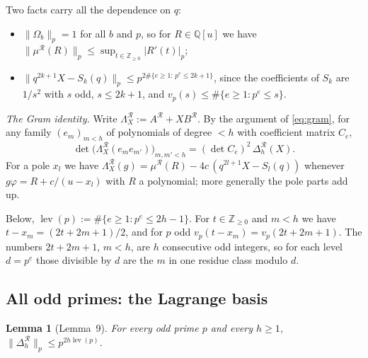 \documentclass[11pt]{amsart}
\newtheorem{lemma}[theorem]{Lemma}
\theoremstyle{definition}
\theoremstyle{remark}
\numberwithin{equation}{section}
\newcommand{\ZZ}{\mathbb{Z}}
\newcommand{\QQ}{\mathbb{Q}}
\newcommand{\cR}{\mathcal{R}}
\newcommand{\lev}{\operatorname{lev}}
\begin{document}
Two facts carry all the dependence on $q$:
\begin{itemize}
\item[(F1)] $\|\Omega_b\|_p=1$ for all $b$ and $p$, so for $R\in\QQ[u]$ we have
  $\|\mu^{\cR}(R)\|_p\le\sup_{t\in\ZZ_{\ge0}}|R'(t)|_p$;
\item[(F2)] $\|q^{2k+1}X-S_k(q)\|_p\le p^{2\#\{e\ge1:\,p^e\le2k+1\}}$, since the coefficients of $S_k$ are $1/s^2$
  with $s$ odd, $s\le2k+1$, and $v_p(s)\le\#\{e\ge1:p^e\le s\}$.
\end{itemize}

\emph{The Gram identity.} Write $\Lambda^{\cR}_X:=A^{\cR}+XB^{\cR}$. By the argument of \eqref{eq:gram}, for any family
$(e_m)_{m<h}$ of polynomials of degree $<h$ with coefficient matrix $C_e$,
\begin{equation}\label{eq:gramR}
  \det\bigl(\Lambda^{\cR}_X(e_me_{m'})\bigr)_{m,m'<h}=(\det C_e)^2\,\Delta^{\cR}_h(X).
\end{equation}
For a pole $x_l$ we have $\Lambda^{\cR}_X(g)=\mu^{\cR}(R)-4c\,(q^{2l+1}X-S_l(q))$ whenever $g\varphi=R+c/(u-x_l)$ with $R$
a polynomial; more generally the pole parts add up.

Below, $\lev(p):=\#\{e\ge1:p^e\le2h-1\}$. For $t\in\ZZ_{\ge0}$ and $m<h$ we have $t-x_m=(2t+2m+1)/2$, and for $p$ odd
$v_p(t-x_m)=v_p(2t+2m+1)$. The numbers $2t+2m+1$, $m<h$, are $h$ consecutive odd integers, so for each level
$d=p^e$ those divisible by $d$ are the $m$ in one residue class modulo $d$.

\subsection{All odd primes: the Lagrange basis}

\begin{lemma}[Lemma~9]\label{lem:nine}
For every odd prime $p$ and every $h\ge1$, $\|\Delta^{\cR}_h\|_p\le p^{2h\lev(p)}$.
\end{lemma}
\end{document}
